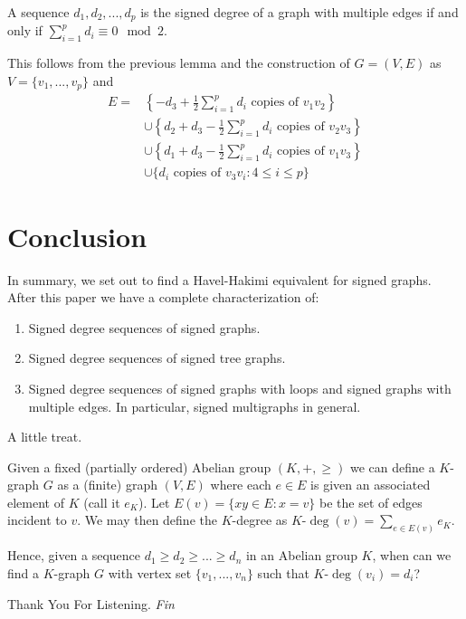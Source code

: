 \begin{frame}
	\begin{theorem}
		A sequence $d_1, d_2, ..., d_p$ is the signed degree of a graph with multiple edges if and only if $\sum_{i = 1}^{p} d_i \equiv 0 \mod 2$.
	\end{theorem}
	This follows from the previous lemma and the construction of $G = (V,E)$ as $V = \{ v_1, ..., v_p \}$ and 
		\begin{align*}
			E = 
				& \left\{ -d_3 + \frac{1}{2}\sum_{i = 1}^{p} d_i \text{ copies of }  v_1v_2\right\} \\
				& \cup \left\{ d_2 + d_3 - \frac{1}{2}\sum_{i = 1}^{p} d_i \text{ copies of } v_2v_3\right\} \\
				& \cup \left\{ d_1 + d_3 - \frac{1}{2}\sum_{i = 1}^{p} d_i \text{ copies of } v_1v_3\right\} \\ 
				& \cup \{ d_i \text{ copies of } v_3v_i : 4 \leq i \leq p \}
		\end{align*}
\end{frame}



\section{Conclusion}


\begin{frame}
	In summary, we set out to find a Havel-Hakimi equivalent for signed graphs. After this paper we have a complete characterization of:
		\begin{enumerate}
			\item Signed degree sequences of signed graphs.
			\item Signed degree sequences of signed tree graphs.
			\item Signed degree sequences of signed graphs with loops and signed graphs with multiple edges. In particular, signed multigraphs in general.
		\end{enumerate}
\end{frame}


\begin{frame}{A little treat.}
	\begin{problem}
		Given a fixed (partially ordered) Abelian group $(K, +, \geq)$ we can define a $K$-graph $G$ as a (finite) graph $(V,E)$ where each $e \in E$ is given an associated element of $K$ (call it $e_K$). Let $E(v) = \{ xy \in E : x = v \}$ be the set of edges incident to $v$. We may then define the $K$-degree as $K\text{-}\deg(v) = \sum_{e \in E(v)} e_K$. 
		
		Hence, given a sequence $d_1 \geq d_2 \geq ... \geq d_n$ in an Abelian group $K$, when can we find a $K$-graph $G$ with vertex set $\{ v_1, ..., v_n \}$ such that $K\text{-}\deg(v_i) = d_i$? 
	\end{problem}
\end{frame}

\begin{frame}{Thank You For Listening.}
	\centering \Huge
	\emph{Fin}
\end{frame}
